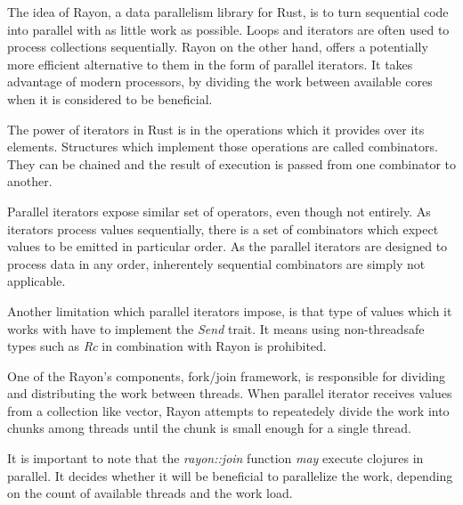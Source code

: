 The idea of Rayon, a data parallelism library for Rust, is to turn sequential code into parallel with as little work as possible. Loops and iterators are often used to process collections sequentially. Rayon on the other hand, offers a potentially more efficient alternative to them in the form of parallel iterators. It takes advantage of modern processors, by dividing the work between available cores when it is considered to be beneficial. 

The power of iterators in Rust is in the operations which it provides over its elements. Structures which implement those operations are called combinators. They can be chained and the result of execution is passed from one combinator to another. 


Parallel iterators expose similar set of operators, even though not entirely. As iterators process values sequentially, there is a set of combinators which expect values to be emitted in particular order. As the parallel iterators are designed to process data in any order, inherentely sequential combinators are simply not applicable. 

Another limitation which parallel iterators impose, is that type of values which it works with have to implement the \emph{Send} trait. It means using non-threadsafe types such as \emph{Rc} in combination with Rayon is prohibited. 


One of the Rayon's components, fork/join framework, is responsible for dividing and distributing the work between threads. When parallel iterator receives values from a collection like vector, Rayon attempts to repeatedely divide the work into chunks among threads until the chunk is small enough for a single thread. 



It is important to note that the \emph{rayon::join} function \emph{may} execute clojures in parallel. It decides whether it will be beneficial to parallelize the work, depending on the count of available threads and the work load. 

